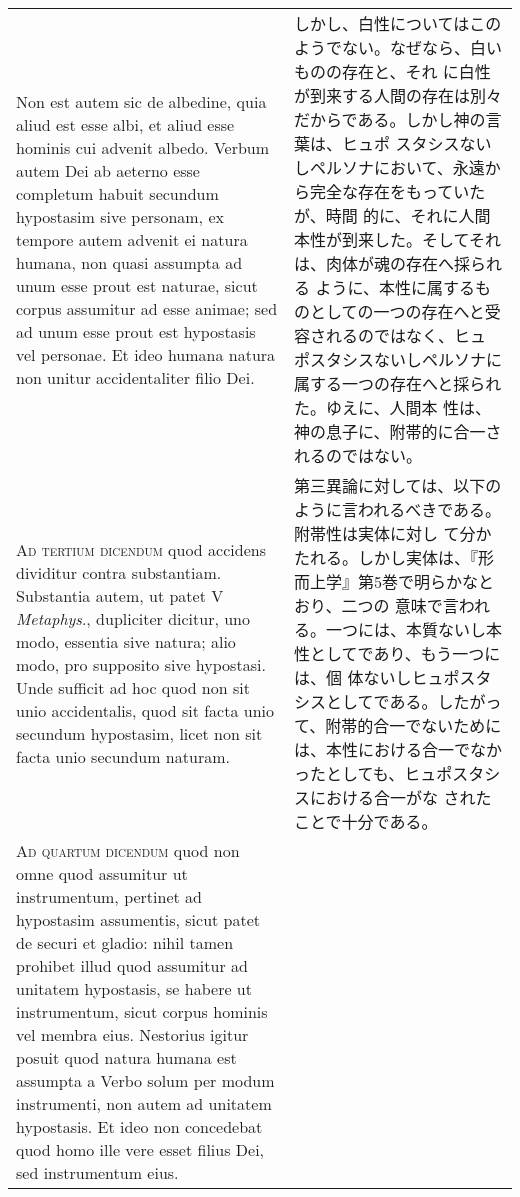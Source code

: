 \documentclass[10pt]{jsarticle} %
\begin{document}
\begin{longtable}{p{21em}p{21em}}
\\


Non est autem sic de albedine, quia aliud est esse albi, et aliud esse
hominis cui advenit albedo. Verbum autem Dei ab aeterno esse completum
habuit secundum hypostasim sive personam, ex tempore autem advenit ei
natura humana, non quasi assumpta ad unum esse prout est naturae,
sicut corpus assumitur ad esse animae; sed ad unum esse prout est
hypostasis vel personae. Et ideo humana natura non unitur
accidentaliter filio Dei.

&

しかし、白性についてはこのようでない。なぜなら、白いものの存在と、それ
に白性が到来する人間の存在は別々だからである。しかし神の言葉は、ヒュポ
スタシスないしペルソナにおいて、永遠から完全な存在をもっていたが、時間
的に、それに人間本性が到来した。そしてそれは、肉体が魂の存在へ採られる
ように、本性に属するものとしての一つの存在へと受容されるのではなく、ヒュ
ポスタシスないしペルソナに属する一つの存在へと採られた。ゆえに、人間本
性は、神の息子に、附帯的に合一されるのではない。


\\



{\scshape Ad tertium dicendum} quod accidens dividitur contra
substantiam. Substantia autem, ut patet V {\itshape Metaphys}.,
dupliciter dicitur, uno modo, essentia sive natura; alio modo, pro
supposito sive hypostasi. Unde sufficit ad hoc quod non sit unio
accidentalis, quod sit facta unio secundum hypostasim, licet non sit
facta unio secundum naturam.

&

第三異論に対しては、以下のように言われるべきである。附帯性は実体に対し
て分かたれる。しかし実体は、『形而上学』第5巻で明らかなとおり、二つの
意味で言われる。一つには、本質ないし本性としてであり、もう一つには、個
体ないしヒュポスタシスとしてである。したがって、附帯的合一でないために
は、本性における合一でなかったとしても、ヒュポスタシスにおける合一がな
されたことで十分である。


\\



{\scshape Ad quartum dicendum} quod non omne quod assumitur ut
instrumentum, pertinet ad hypostasim assumentis, sicut patet de securi
et gladio: nihil tamen prohibet illud quod assumitur ad unitatem
hypostasis, se habere ut instrumentum, sicut corpus hominis vel membra
eius. Nestorius igitur posuit quod natura humana est assumpta a Verbo
solum per modum instrumenti, non autem ad unitatem hypostasis.  Et
ideo non concedebat quod homo ille vere esset filius Dei, sed
instrumentum eius.


\end{longtable}
\end{document}
